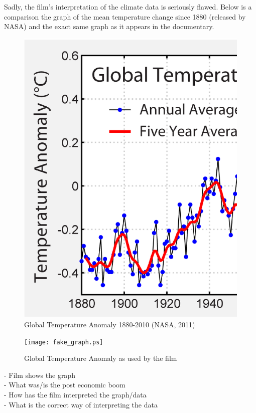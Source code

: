 \documentclass[12pt]{article}
\begin{document}
    Sadly, the film's interpretation of the climate data is seriously flawed. Below is a comparison the graph of the mean temperature change since 1880 (released by NASA) and the exact same graph as it appears in the documentary.
    
    \begin{figure}[h!]
        \centering
        \includegraphics[scale=0.3]{Instrumental_Temperature_Record.ps}
        \caption{Global Temperature Anomaly 1880-2010 (NASA, 2011)}
    \end{figure}
    
    \begin{figure}[h!]
        \centering
        \texttt{[image: fake\_graph.ps]}
        \caption{Global Temperature Anomaly as used by the film}
    \end{figure}
           
	- Film shows the graph\\
	- What was/is the post economic boom\\
	- How has the film interpreted the graph/data\\
	- What is the correct way of interpreting the data\\
\end{document}
